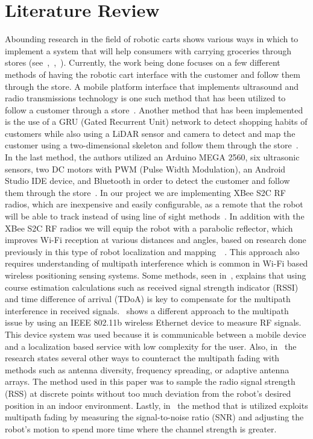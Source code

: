 \documentclass[letterpaper,12pt]{article}   %
\begin{document}
\section{Literature Review} %

Abounding research in the field of robotic carts shows various ways in which to implement a system that will help consumers with carrying groceries through stores (see~\cite{Rawashdeh2017-Person},~\cite{islam_lam_fukuda_kobayashi_kuno_2019},~\cite{Sales2016-CompaRob}). Currently, the work being done focuses on a few different methods of having the robotic cart interface with the customer and follow them through the store. A mobile platform interface that implements ultrasound and radio transmissions technology is one such method that has been utilized to follow a customer through a store~\cite{Sales2016-CompaRob}. Another method that has been implemented is the use of a GRU (Gated Recurrent Unit) network to detect shopping habits of customers while also using a LiDAR sensor and camera to detect and map the customer using a two-dimensional skeleton and follow them through the store~\cite{islam_lam_fukuda_kobayashi_kuno_2019}. In the last method, the authors utilized an Arduino MEGA 2560, six ultrasonic sensors, two DC motors with PWM (Pulse Width Modulation), an Android Studio IDE device, and Bluetooth in order to detect the customer and follow them through the store~\cite{Rawashdeh2017-Person}. In our project we are implementing XBee S2C RF radios, which are inexpensive and easily configurable, as a remote that the robot will be able to track instead of using line of sight methods~\cite{Miah2018-Intelligent}. In addition with the XBee S2C RF radios we will equip the robot with a parabolic reflector, which improves Wi-Fi reception at various distances and angles, based on research done previously in this type of robot localization and mapping~\cite{Miah2018-Intelligent}~\cite{Li2013ANA}. This approach also requires understanding of multipath interference which is common in Wi-Fi based wireless positioning sensing systems. Some methods, seen in~\cite{xie_jiang_zhao_zhang_2019}, explains that using course estimation calculations such as received signal strength indicator (RSSI) and time difference of arrival (TDoA) is key to compensate for the multipath interference in received signals.~\cite{ladd_bekris_rudys_kavraki_wallach_2005} shows a different approach to the multipath issue by using an IEEE 802.11b wireless Ethernet device to measure RF signals. This device system was used because it is communicable between a mobile device and a localization based service with low complexity for the user. Also, in~\cite{lindhe_johansson_bicchi_2007} the research states several other ways to counteract the multipath fading with methods such as antenna diversity, frequency spreading, or adaptive antenna arrays. The method used in this paper was to sample the radio signal strength (RSS) at discrete points without too much deviation from the robot's desired position in an indoor environment. Lastly, in~\cite{Lindhe2009} the method that is utilized exploits multipath fading by measuring the signal-to-noise ratio (SNR) and adjusting the robot's motion to spend more time where the channel strength is greater.
\end{document}
